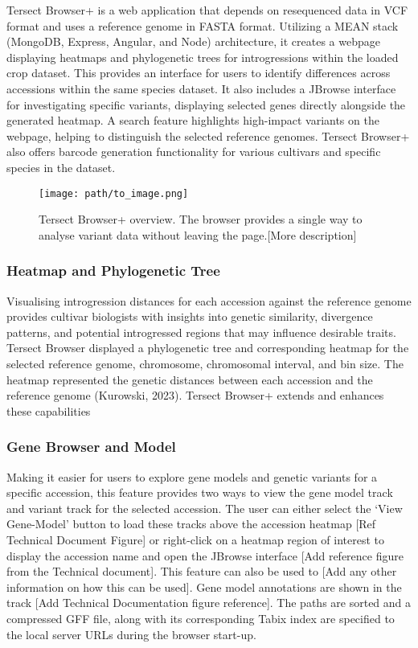 \documentclass[unnumsec,webpdf,contemporary,large]{oup-authoring-template}%
\theoremstyle{thmstyleone}%
\theoremstyle{thmstyletwo}%
\theoremstyle{thmstylethree}%
\begin{document}

Tersect Browser+ is a web application that depends on resequenced data in VCF format and uses a reference genome in FASTA format. Utilizing a MEAN stack (MongoDB, Express, Angular, and Node) architecture, it creates a webpage displaying heatmaps and phylogenetic trees for introgressions within the loaded crop dataset. This provides an interface for users to identify differences across accessions within the same species dataset. It also includes a JBrowse interface for investigating specific variants, displaying selected genes directly alongside the generated heatmap. A search feature highlights high-impact variants on the webpage, helping to distinguish the selected reference genomes. Tersect Browser+ also offers barcode generation functionality for various cultivars and specific species in the dataset.

\begin{figure} [http]
  \centering
  \texttt{[image: path/to\_image.png]}
  \caption{Tersect Browser+ overview. The browser provides a single way to analyse variant data without leaving the page.[More description]}
  \label{fig:your_label}
\end{figure}

\subsubsection{Heatmap and Phylogenetic Tree}

Visualising introgression distances for each accession against the reference genome provides cultivar biologists with insights into genetic similarity, divergence patterns, and potential introgressed regions that may influence desirable traits. Tersect Browser displayed a phylogenetic tree and corresponding heatmap for the selected reference genome, chromosome, chromosomal interval, and bin size. The heatmap represented the genetic distances between each accession and the reference genome (Kurowski, 2023).
Tersect Browser+ extends and enhances these capabilities

\subsubsection{Gene Browser and Model}

Making it easier for users to explore gene models and genetic variants for a specific accession, this feature provides two ways to view the gene model track and variant track for the selected accession.  The user can either select the ‘View Gene-Model’ button to load these tracks above the accession heatmap [Ref Technical Document Figure] or right-click on a heatmap region of interest to display the accession name and open the JBrowse interface [Add reference figure from the Technical document].  This feature can also be used to [Add any other information on how this can be used].
Gene model annotations are shown in the track [Add Technical Documentation figure reference]. The paths are sorted and a compressed GFF file, along with its corresponding Tabix index are specified to the local server URLs during the browser start-up.  
\end{document}
